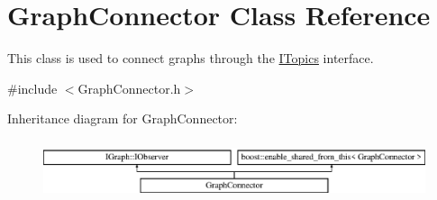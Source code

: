 \hypertarget{class_graph_connector}{}\section{Graph\+Connector Class Reference}
\label{class_graph_connector}


This class is used to connect graphs through the \hyperlink{class_i_topics}{I\+Topics} interface.  




{\ttfamily \#include $<$Graph\+Connector.\+h$>$}

Inheritance diagram for Graph\+Connector\+:\begin{figure}[H]
\begin{center}
\leavevmode
\includegraphics[height=1.772152cm]{class_graph_connector}
\end{center}
\end{figure}
